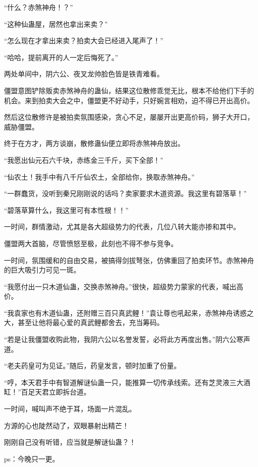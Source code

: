 \begin{this_body}
“什么？赤煞神舟！？”

“这种仙蛊屋，居然也拿出来卖？”

“怎么现在才拿出来卖？拍卖大会已经进入尾声了！”

“哈哈，提前离开的人一定后悔死了。”

两处单间中，阴六公、夜叉龙帅脸色皆是铁青难看。

僵盟意图铲除贩卖赤煞神舟的蛊仙，结果这位散修乖觉无比，根本不给他们下手的机会。来到拍卖大会之中，僵盟更不好动手，只好婉言相劝，迫不得已开出高价。

然后这位散修许是被拍卖氛围感染，贪心不足，屡屡开出更高价码，狮子大开口，威胁僵盟。

终于在方才，两方谈崩，散修蛊仙便立即将赤煞神舟放出。

“我愿出仙元石六千块，赤练金三千斤，买下全部！”

“仙农土！我手中有八千斤仙农土，全部给你，换取赤煞神舟。”

“一群蠢货，没听到秦兄刚刚说的话吗？卖家要求木道资源。我这里有碧落草！”

“碧落草算什么，我这里可有本性根！！”

一时间，群情激动，尤其是各大超级势力的代表，几位八转大能亦掺和其中。

僵盟两大首脑，尽管愤怒至极，此刻也不得不参与竞争。

一时间，氛围缓和的自由交易，被搞得剑拔弩张，仿佛重回了拍卖环节。赤煞神舟的巨大吸引力可见一斑。

“我愿付出一只木道仙蛊，交换赤煞神舟。”很快，超级势力蒙家的代表，喊出高价。

“我袁家也有木道仙蛊，还附赠三百只真武鲤！”袁让尊也吼起来，赤煞神舟诱惑之大，甚至让他将最心爱的真武鲤都舍去，充当筹码。

“若是让我僵盟收购此物，我阴六公以名誉发誓，必将此方再度出售。”阴六公寒声道。

“老夫药皇可为见证。”随后，药皇发言，顿时加重了份量。

“哼，本天君手中有智道解谜仙蛊一只，能推算一切传承线索。还有芝灵液三大酒缸！”百足天君立即拆台道。

一时间，喊叫声不绝于耳，场面一片混乱。

方源的心也陡然动了，双眼暴射出精芒！

刚刚自己没有听错，应当就是解谜仙蛊？！

ps：今晚只一更。

\end{this_body}

